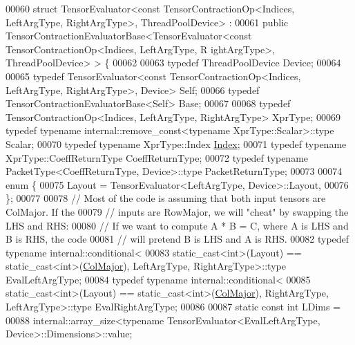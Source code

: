 \begin{DoxyCode}
00060 \textcolor{keyword}{struct }TensorEvaluator<const TensorContractionOp<Indices, LeftArgType, RightArgType>, ThreadPoolDevice> :
00061     \textcolor{keyword}{public} TensorContractionEvaluatorBase<TensorEvaluator<const TensorContractionOp<Indices, LeftArgType, R
      ightArgType>, ThreadPoolDevice> > \{
00062 
00063   \textcolor{keyword}{typedef} ThreadPoolDevice Device;
00064 
00065   \textcolor{keyword}{typedef} TensorEvaluator<const TensorContractionOp<Indices, LeftArgType, RightArgType>, Device> Self;
00066   \textcolor{keyword}{typedef} TensorContractionEvaluatorBase<Self> Base;
00067 
00068   \textcolor{keyword}{typedef} TensorContractionOp<Indices, LeftArgType, RightArgType> XprType;
00069   \textcolor{keyword}{typedef} \textcolor{keyword}{typename} internal::remove\_const<typename XprType::Scalar>::type Scalar;
00070   \textcolor{keyword}{typedef} \textcolor{keyword}{typename} XprType::Index \hyperlink{namespace_eigen_a62e77e0933482dafde8fe197d9a2cfde}{Index};
00071   \textcolor{keyword}{typedef} \textcolor{keyword}{typename} XprType::CoeffReturnType CoeffReturnType;
00072   \textcolor{keyword}{typedef} \textcolor{keyword}{typename} PacketType<CoeffReturnType, Device>::type PacketReturnType;
00073 
00074   \textcolor{keyword}{enum} \{
00075     Layout = TensorEvaluator<LeftArgType, Device>::Layout,
00076   \};
00077 
00078   \textcolor{comment}{// Most of the code is assuming that both input tensors are ColMajor. If the}
00079   \textcolor{comment}{// inputs are RowMajor, we will "cheat" by swapping the LHS and RHS:}
00080   \textcolor{comment}{// If we want to compute A * B = C, where A is LHS and B is RHS, the code}
00081   \textcolor{comment}{// will pretend B is LHS and A is RHS.}
00082   \textcolor{keyword}{typedef} \textcolor{keyword}{typename} internal::conditional<
00083     \textcolor{keyword}{static\_cast<}\textcolor{keywordtype}{int}\textcolor{keyword}{>}(Layout) == static\_cast<int>(\hyperlink{group__enums_ggaacded1a18ae58b0f554751f6cdf9eb13a0cbd4bdd0abcfc0224c5fcb5e4f6669a}{ColMajor}), LeftArgType, RightArgType>::type 
      EvalLeftArgType;
00084   \textcolor{keyword}{typedef} \textcolor{keyword}{typename} internal::conditional<
00085     \textcolor{keyword}{static\_cast<}\textcolor{keywordtype}{int}\textcolor{keyword}{>}(Layout) == static\_cast<int>(\hyperlink{group__enums_ggaacded1a18ae58b0f554751f6cdf9eb13a0cbd4bdd0abcfc0224c5fcb5e4f6669a}{ColMajor}), RightArgType, LeftArgType>::type 
      EvalRightArgType;
00086 
00087   \textcolor{keyword}{static} \textcolor{keyword}{const} \textcolor{keywordtype}{int} LDims =
00088       internal::array\_size<typename TensorEvaluator<EvalLeftArgType, Device>::Dimensions>::value;

\end{DoxyCode}
